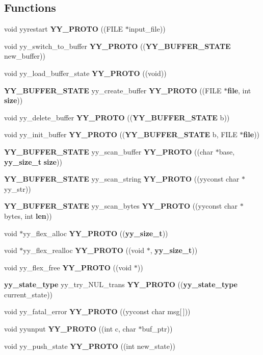 \subsection*{Functions}
\begin{CompactItemize}
\item 
void yyrestart {\bf YY\_\-PROTO} ((FILE $\ast$input\_\-file))
\item 
void yy\_\-switch\_\-to\_\-buffer {\bf YY\_\-PROTO} (({\bf YY\_\-BUFFER\_\-STATE} new\_\-buffer))
\item 
void yy\_\-load\_\-buffer\_\-state {\bf YY\_\-PROTO} ((void))
\item 
{\bf YY\_\-BUFFER\_\-STATE} yy\_\-create\_\-buffer {\bf YY\_\-PROTO} ((FILE $\ast${\bf file}, int {\bf size}))
\item 
void yy\_\-delete\_\-buffer {\bf YY\_\-PROTO} (({\bf YY\_\-BUFFER\_\-STATE} b))
\item 
void yy\_\-init\_\-buffer {\bf YY\_\-PROTO} (({\bf YY\_\-BUFFER\_\-STATE} b, FILE $\ast${\bf file}))
\item 
{\bf YY\_\-BUFFER\_\-STATE} yy\_\-scan\_\-buffer {\bf YY\_\-PROTO} ((char $\ast$base, {\bf yy\_\-size\_\-t} {\bf size}))
\item 
{\bf YY\_\-BUFFER\_\-STATE} yy\_\-scan\_\-string {\bf YY\_\-PROTO} ((yyconst char $\ast$yy\_\-str))
\item 
{\bf YY\_\-BUFFER\_\-STATE} yy\_\-scan\_\-bytes {\bf YY\_\-PROTO} ((yyconst char $\ast$bytes, int {\bf len}))
\item 
void $\ast$yy\_\-flex\_\-alloc {\bf YY\_\-PROTO} (({\bf yy\_\-size\_\-t}))
\item 
void $\ast$yy\_\-flex\_\-realloc {\bf YY\_\-PROTO} ((void $\ast$, {\bf yy\_\-size\_\-t}))
\item 
void yy\_\-flex\_\-free {\bf YY\_\-PROTO} ((void $\ast$))
\item 
{\bf yy\_\-state\_\-type} yy\_\-try\_\-NUL\_\-trans {\bf YY\_\-PROTO} (({\bf yy\_\-state\_\-type} current\_\-state))
\item 
void yy\_\-fatal\_\-error {\bf YY\_\-PROTO} ((yyconst char msg[$\,$]))
\item 
void yyunput {\bf YY\_\-PROTO} ((int c, char $\ast$buf\_\-ptr))
\item 
void yy\_\-push\_\-state {\bf YY\_\-PROTO} ((int new\_\-state))
\end{CompactItemize}
